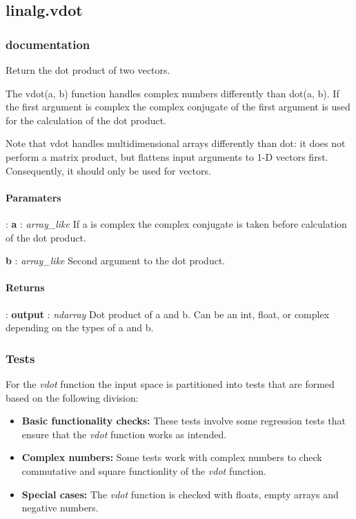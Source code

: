 \documentclass[a4paper,11pt]{article}
\begin{document}
\subsection{linalg.vdot}

\subsubsection{documentation}
Return the dot product of two vectors.

The vdot(a, b) function handles complex numbers differently than dot(a, b). If the first argument is complex the complex conjugate of the first argument is used for the calculation of the dot product.

Note that vdot handles multidimensional arrays differently than dot: it does not perform a matrix product, but flattens input arguments to 1-D vectors first. Consequently, it should only be used for vectors.

\paragraph{Paramaters}:	
\textbf{a} : \textit{array\_like} If a is complex the complex conjugate is taken before calculation of the dot product.

\indent \hspace{2.3cm}\textbf{b} : \textit{array\_like} Second argument to the dot product.

\paragraph{Returns}:	
\indent \hspace{0.1cm}\textbf{output} : \textit{ndarray} Dot product of a and b. Can be an int, float, or complex depending on the types of a and b.



\subsubsection{Tests}

For the \textit{vdot} function the input space is partitioned into tests that are formed based on the following division:

\begin{itemize}
	\item \textbf{Basic functionality checks:} These tests involve some regression tests that ensure that the \textit{vdot} function works as intended.
	
	\item \textbf{Complex numbers:} Some tests work with complex numbers to check commutative and square functionlity of the \textit{vdot} function.
	
	\item \textbf{Special cases:} The \textit{vdot} function is checked with floats, empty arrays and negative numbers.
\end{itemize}
\end{document}
